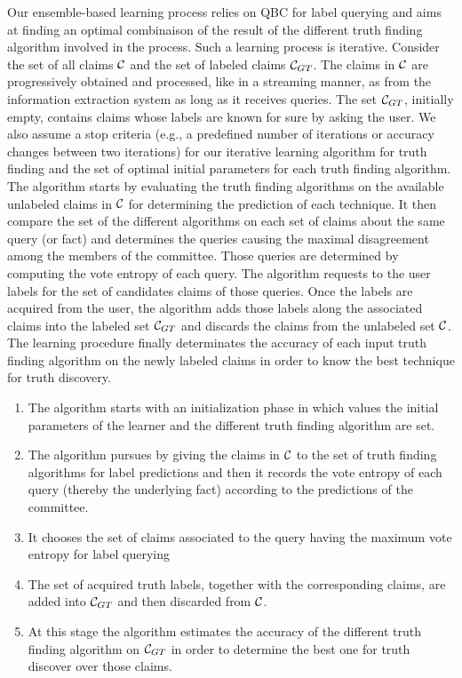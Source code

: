 Our ensemble-based learning process relies on QBC for label querying and aims at finding an optimal combinaison of the result
of the different truth finding algorithm involved in the process. Such a learning process is iterative. Consider the set of 
all claims $\mathcal{C}{}$ and the set of labeled claims $\mathcal{C}_{GT}$. The claims in $\mathcal{C}{}$ are progressively obtained
and processed, like in a streaming manner, as from the information extraction system as long as it receives queries.
The set $\mathcal{C}_{GT}$, initially empty, contains
claims whose labels are known for sure by asking the user. We also assume a stop criteria (e.g., a predefined number of iterations 
or accuracy changes between two iterations) for our iterative learning algorithm for truth finding and the set of optimal initial
parameters for each truth finding algorithm.
The algorithm starts by evaluating the truth finding algorithms on the available unlabeled claims in $\mathcal{C}{}$ for determining
the prediction of each technique. It then compare the set of the different algorithms on each set of claims about the same query (or fact)
and determines the queries causing the maximal disagreement among the members of the committee. Those queries are determined by computing 
the vote entropy of each query. The algorithm requests to the user labels for the set of candidates claims of those queries. Once the labels
are acquired from the user, the algorithm adds those labels along the associated claims into the labeled set $\mathcal{C}_{GT}$ and discards the
claims from the unlabeled set $\mathcal{C}{}$. The learning procedure finally determinates the accuracy of each input truth finding algorithm on
the newly labeled claims in order to know the best technique for truth discovery. 

\begin{enumerate}
\item The algorithm starts with an initialization phase in which values the initial parameters of the learner and the different truth 
finding algorithm are set.
 \item The algorithm pursues by giving the claims in $\mathcal{C}{}$ to the set of truth finding algorithms for label predictions and then 
 it records the vote entropy of each query (thereby the underlying fact) according to the predictions of the committee.
 \item It chooses the set of claims associated to the query having the maximum vote entropy for label querying
 \item The set of acquired truth labels, together with the corresponding claims, are added into  $\mathcal{C}_{GT}$ and then discarded from $\mathcal{C}{}$.
 \item At this stage the algorithm estimates the accuracy of the different truth finding algorithm on  $\mathcal{C}_{GT}$ in order to determine the best one
 for truth discover over those claims.
\end{enumerate}

